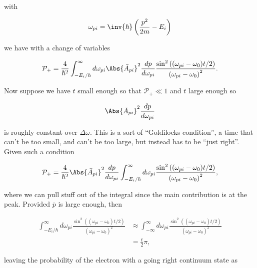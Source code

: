with 

\begin{equation}\label{eqn:qmTwoL10:370}
\omega_{pi} = \inv{\hbar}\left( \frac{p^2}{2m} - E_i
\right)
\end{equation}

we have with a change of variables

\begin{equation}\label{eqn:qmTwoL10:390}
\mathcal{P}_{+} 
=
\frac{4}{\hbar^2}
\int_{-E_i/\hbar}^\infty d\omega_{pi}
\Abs{
\bar{A}_{pi}
}^2 
\frac{dp}{d\omega_{pi}}
\frac{
\sin^2\left( (\omega_{pi} - \omega_0) t/2 \right)
}{
\left( \omega_{pi} - \omega_0 \right)^2
}.
\end{equation}

Now suppose we have $t$ small enough so that $\mathcal{P}_{+} \ll 1$ and $t$ large enough so 

\begin{equation}\label{eqn:qmTwoL10:410}
\Abs{
\bar{A}_{pi}
}^2 
\frac{dp}{d\omega_{pi}}
\end{equation}

is roughly constant over $\Delta \omega$.  This is a sort of ``Goldilocks condition'', a time that can't be too small, and can't be too large, but instead has to be ``just right''.  Given such a condition

\begin{equation}\label{eqn:qmTwoL10:430}
\mathcal{P}_{+} 
=
\frac{4}{\hbar^2}
\Abs{
\bar{A}_{pi}
}^2 
\frac{dp}{d\omega_{pi}}
\int_{-E_i/\hbar}^\infty d\omega_{pi}
\frac{
\sin^2\left( (\omega_{pi} - \omega_0) t/2 \right)
}{
\left( \omega_{pi} - \omega_0 \right)^2
},
\end{equation}

where we can pull stuff out of the integral since the main contribution is at the peak.  Provided $\bar{p}$ is large enough, then 

\begin{equation}\label{eqn:qmTwoL10:450}
\begin{aligned}
\int_{-E_i/\hbar}^\infty d\omega_{pi}
\frac{
\sin^2\left( (\omega_{pi} - \omega_0) t/2 \right)
}{
\left( \omega_{pi} - \omega_0 \right)^2
}
&\approx 
\int_{-\infty}^\infty d\omega_{pi}
\frac{
\sin^2\left( (\omega_{pi} - \omega_0) t/2 \right)
}{
\left( \omega_{pi} - \omega_0 \right)^2
} \\
&=
\frac{t}{2} \pi,
\end{aligned}
\end{equation}

leaving the probability of the electron with a going right continuum state as

